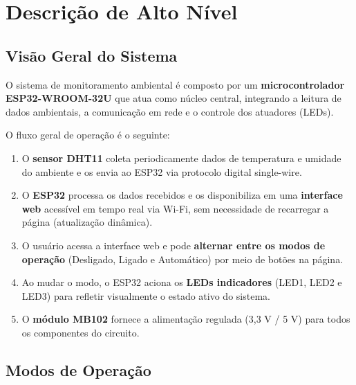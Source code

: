 
\section{Descrição de Alto Nível}

\subsection{Visão Geral do Sistema}

O sistema de monitoramento ambiental é composto por um \textbf{microcontrolador ESP32-WROOM-32U}
que atua como núcleo central, integrando a leitura de dados ambientais, a comunicação
em rede e o controle dos atuadores (LEDs).

O fluxo geral de operação é o seguinte:

\begin{enumerate}
    \item O \textbf{sensor DHT11} coleta periodicamente dados de temperatura e umidade
    do ambiente e os envia ao ESP32 via protocolo digital single-wire.

    \item O \textbf{ESP32} processa os dados recebidos e os disponibiliza em uma
    \textbf{interface web} acessível em tempo real via Wi-Fi, sem necessidade de
    recarregar a página (atualização dinâmica).

    \item O usuário acessa a interface web e pode \textbf{alternar entre os modos de
    operação} (Desligado, Ligado e Automático) por meio de botões na página.

    \item Ao mudar o modo, o ESP32 aciona os \textbf{LEDs indicadores} (LED1, LED2 e LED3)
    para refletir visualmente o estado ativo do sistema.

    \item O \textbf{módulo MB102} fornece a alimentação regulada (3,3 V / 5 V) para
    todos os componentes do circuito.
\end{enumerate}


\subsection{Modos de Operação}

